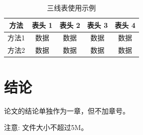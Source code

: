 \documentclass[zihao=-4]{ctexart}
\begin{document}
\begin{spacing}{1.5}
\begin{table}[H]
\begin{tabular}{|l||c|c|c|c|c|c|}
\end{tabular}
\end{table}


\begin{table}[H]
\caption{三线表使用示例}
\centering
\begin{tabular}{ccccc}
\hline  
\textbf{方法} & \textbf{表头 1} & \textbf{表头 2} & \textbf{表头 3} & \textbf{表头 4} \\ 
\hline  
方法1 & 数据  & 数据  & 数据  & 数据\\
方法2 & 数据  & 数据  & 数据  & 数据\\
\hline
\end{tabular} 
\end{table} 

\section*{结论}%
论文的结论单独作为一章，但不加章号。

注意: 文件大小不超过5M。

\end{spacing}

\newpage











% 


% 
\end{document}
